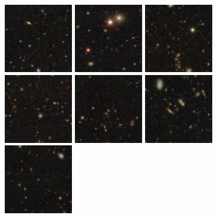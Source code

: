 \begin{figure}
\begin{center}
\includegraphics[angle=0,width=3.0cm]{figures/thumbnails/SN2007lw.png}
\includegraphics[angle=0,width=3.0cm]{figures/thumbnails/SN2007mk.png}
\includegraphics[angle=0,width=3.0cm]{figures/thumbnails/SN2007ml.png}
\includegraphics[angle=0,width=3.0cm]{figures/thumbnails/SN2007nd.png}
\includegraphics[angle=0,width=3.0cm]{figures/thumbnails/SN2007pj.png}
\includegraphics[angle=0,width=3.0cm]{figures/thumbnails/SN2007qp.png}
\includegraphics[angle=0,width=3.0cm]{figures/thumbnails/SN2007qy.png}

\end{center}
\end{figure}
